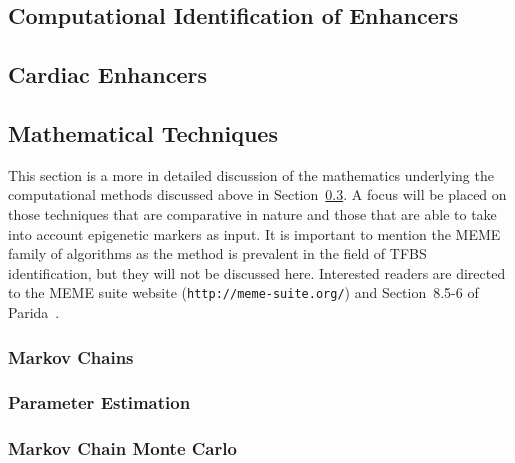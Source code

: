 \documentclass[12pt,a4paper]{article}
\begin{document}
        \subsection{Computational Identification of Enhancers}
        \label{sSec:computational}
         
        \subsection{Cardiac Enhancers}
        
        \subsection{Mathematical Techniques}
        \label{sSec:mathematical}
        This section is a more in detailed discussion of the mathematics underlying the computational methods discussed above in Section~\ref{sSec:mathematical}. A focus will be placed on those techniques that are comparative in nature and those that are able to take into account epigenetic markers as input. It is important to mention the MEME family of algorithms as the method is prevalent in the field of TFBS identification, but they will not be discussed here.%
        Interested readers are directed to the MEME suite website (\texttt{http://meme-suite.org/}) and Section~8.5-6 of Parida~\cite{parida2007pattern}.

            

            \subsubsection{Markov Chains}
            
            
            \subsubsection{Parameter Estimation}
            
            
            \subsubsection{Markov Chain Monte Carlo}
            
            
\end{document}
